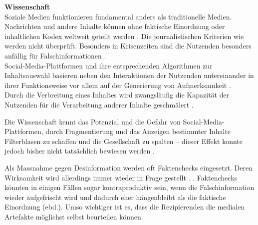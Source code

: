 \documentclass[12pt,a4paper]{article}        %
\begin{document}
\textbf{Wissenschaft} \\
Soziale Medien funktionieren fundamental anders als traditionelle Medien. Nachrichten und andere Inhalte können ohne faktische Einordnung oder inhaltlichen Kodex weltweit geteilt werden \parencite[211]{allcott_social_2017}. Die journalistischen Kriterien wie \parencite[9]{grujic_warnhinweise_2024} werden nicht überprüft. Besonders in Krisenzeiten sind die Nutzenden besonders anfällig für Falschinformationen \parencite[vgl.][2]{ceron_fake_2021}. \\
Social-Media-Plattformen und ihre entsprechenden Algorithmen zur Inhaltsauswahl basieren neben den Interaktionen der Nutzenden untereinander in ihrer Funktionsweise vor allem auf der Generierung von Aufmerksamkeit \parencites[vgl.][220]{schmidt_meinungsbildung_2022}[493]{behnke_manipulation_2018}. \\
Durch die Verbreitung eines Inhaltes wird zwangsläufig die Kapazität der Nutzenden für die Verarbeitung anderer Inhalte geschmälert \parencite[248]{hohlfeld_schlechte_2020}.

Die Wissenschaft kennt das Potenzial und die Gefahr von Social-Media-Plattformen, durch Fragmentierung und das Anzeigen bestimmter Inhalte Filterblasen zu schaffen und die Gesellschaft zu spalten – dieser Effekt konnte jedoch bisher nicht tatsächlich bewiesen werden \parencite[220]{schmidt_meinungsbildung_2022}.

Als Massnahme gegen Desinformation werden oft Faktenchecks eingesetzt. Deren Wirksamkeit wird allerdings immer wieder in Frage gestellt \parencites[1095]{lazer_science_2018}[4f]{ceron_fake_2021}.  \parencites[1095]{lazer_science_2018}\parencite[vgl.\ auch][18]{grujic_warnhinweise_2024}. Faktenchecks könnten in einigen Fällen sogar kontraproduktiv sein, wenn  die Falschinformation wieder aufgefrischt wird und dadurch eher hängenbleibt als die faktische Einordnung (ebd.). Umso wichtiger ist es, dass die Rezipierenden die medialen Artefakte möglichst selbst beurteilen können.
\end{document}
